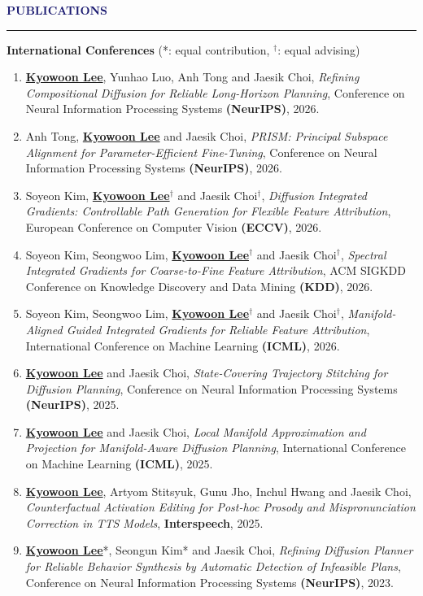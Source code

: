 \documentclass{resume} %
\renewenvironment{rSection}[1]{
\sectionskip
\textcolor{MidnightBlue}{\MakeUppercase{#1}}
\sectionlineskip
\hrule
\begin{list}{}{
\setlength{\leftmargin}{1.5em}
}
\item[]
}{
\end{list}
}
\begin{document}
\begin{rSection}{\bf Publications}
{\textbf{International Conferences}} (*: equal contribution, $^\dagger$: equal advising)
\begin{enumerate}
    \item \underline{\textbf{Kyowoon Lee}}, Yunhao Luo, Anh Tong and Jaesik Choi, \emph{Refining Compositional Diffusion for Reliable Long-Horizon Planning}, Conference on Neural Information Processing Systems \textbf{(NeurIPS)}, 2026.
    \item Anh Tong, \underline{\textbf{Kyowoon Lee}} and Jaesik Choi, \emph{PRISM: Principal Subspace Alignment for Parameter-Efficient Fine-Tuning}, Conference on Neural Information Processing Systems \textbf{(NeurIPS)}, 2026.
    \item Soyeon Kim, \underline{\textbf{Kyowoon Lee}}$^\dagger$ and Jaesik Choi$^\dagger$, \emph{Diffusion Integrated Gradients: Controllable Path Generation for Flexible Feature Attribution}, European Conference on Computer Vision \textbf{(ECCV)}, 2026.
    \item Soyeon Kim, Seongwoo Lim, \underline{\textbf{Kyowoon Lee}}$^\dagger$ and Jaesik Choi$^\dagger$, \emph{Spectral Integrated Gradients for Coarse-to-Fine Feature Attribution}, ACM SIGKDD Conference on Knowledge Discovery and Data Mining \textbf{(KDD)}, 2026.
    \item Soyeon Kim, Seongwoo Lim, \underline{\textbf{Kyowoon Lee}}$^\dagger$ and Jaesik Choi$^\dagger$, \emph{Manifold-Aligned Guided Integrated Gradients for Reliable Feature Attribution}, International Conference on Machine Learning \textbf{(ICML)}, 2026.
    \item \underline{\textbf{Kyowoon Lee}} and Jaesik Choi, \emph{State-Covering Trajectory Stitching for Diffusion Planning}, Conference on Neural Information Processing Systems \textbf{(NeurIPS)}, 2025.
    \item \underline{\textbf{Kyowoon Lee}} and Jaesik Choi, \emph{Local Manifold Approximation and Projection for Manifold-Aware Diffusion Planning}, International Conference on Machine Learning \textbf{(ICML)}, 2025.
    \item \underline{\textbf{Kyowoon Lee}}, Artyom Stitsyuk, Gunu Jho, Inchul Hwang and Jaesik Choi, \emph{Counterfactual Activation Editing for Post-hoc Prosody and Mispronunciation Correction in TTS Models}, \textbf{Interspeech}, 2025.
    \item \underline{\textbf{Kyowoon Lee}}*, Seongun Kim* and Jaesik Choi, \emph{Refining Diffusion Planner for Reliable Behavior Synthesis by Automatic Detection of Infeasible Plans}, Conference on Neural Information Processing Systems \textbf{(NeurIPS)}, 2023.

\end{enumerate}
\end{rSection}
\end{document}
